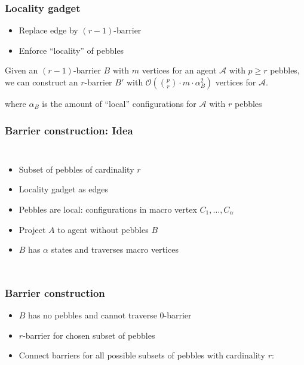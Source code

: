 \documentclass{beamer}
\begin{document}
\begin{frame}
  \frametitle{Locality gadget}
  \begin{itemize}
    \item Replace edge by $(r-1)$-barrier
    \item Enforce \enquote{locality} of pebbles
      \begin{center}
      \end{center}
  \end{itemize}
\end{frame}

\begin{frame}
  \begin{mdframed}
    \begin{theorem}
      Given an $(r-1)$-barrier $B$ with $m$ vertices for an agent $\mathcal{A}$
      with $p\geq r$ pebbles, we can construct an $r$-barrier $B'$ with
      $\mathcal{O}(\binom{p}{r}\cdot m\cdot\alpha_{B}^{2})$ vertices for
      $\mathcal{A}$.
    \end{theorem}
  \end{mdframed}
  where $\alpha_{B}$ is the amount of \enquote{local} configurations for
  $\mathcal{A}$ with $r$ pebbles
\end{frame}

\begin{frame}
  \frametitle{Barrier construction: Idea}
  \begin{columns}
    \begin{itemize}
      \item Subset of pebbles of cardinality $r$
      \item Locality gadget as edges
      \item Pebbles are local: configurations in macro vertex
        $C_{1},\dots,C_{\alpha}$
      \item Project $A$ to agent without pebbles $B$
      \item $B$ has $\alpha$ states and traverses macro vertices
    \end{itemize}
    \resizebox{\textwidth}{!}{}
  \end{columns}
\end{frame}

\begin{frame}
  \frametitle{Barrier construction}
  \begin{itemize}
    \item $B$ has no pebbles and cannot traverse $0$-barrier
    \item $r$-barrier for chosen subset of pebbles
    \item Connect barriers for all possible subsets of pebbles with cardinality
      $r$:
  \end{itemize}
  \begin{center}
    \resizebox{0.8\textwidth}{!}{}
  \end{center}
\end{frame}
\end{document}
